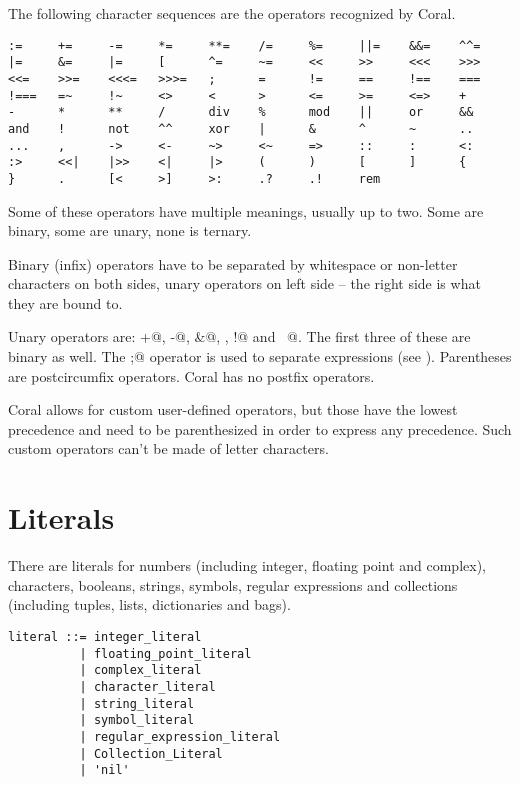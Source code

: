 The following character sequences are the operators recognized by Coral. 

\begin{lstlisting}
:=     +=     -=     *=     **=    /=     %=     ||=    &&=    ^^= 
|=     &=     |=     [      ^=     ~=     <<     >>     <<<    >>> 
<<=    >>=    <<<=   >>>=   ;      =      !=     ==     !==    === 
!===   =~     !~     <>     <      >      <=     >=     <=>    + 
-      *      **     /      div    %      mod    ||     or     && 
and    !      not    ^^     xor    |      &      ^      ~      .. 
...    ,      ->     <-     ~>     <~     =>     ::     :      <: 
:>     <<|    |>>    <|     |>     (      )      [      ]      { 
}      .      [<     >]     >:     .?     .!     rem
\end{lstlisting}

Some of these operators have multiple meanings, usually up to two. Some are binary, some are unary, none is ternary. 

Binary (infix) operators have to be separated by whitespace or non-letter characters on both sides, unary operators on left side – the right side is what they are bound to. 

Unary operators are: \lstinline@+@, \lstinline@-@, \lstinline@&@, \lstinline@not@, \lstinline@!@ and \lstinline@~@. The first three of these are binary as well. The \lstinline@;@ operator is used to separate expressions (see ). Parentheses are postcircumfix operators. Coral has no postfix operators. 

Coral allows for custom user-defined operators, but those have the lowest precedence and need to be parenthesized in order to express any precedence. Such custom operators can't be made of letter characters. 

\section{Literals}\label{sec:literals}

There are literals for numbers (including integer, floating point and complex), characters, booleans, strings, symbols, regular expressions and collections (including tuples, lists, dictionaries and bags). 

\syntax\begin{lstlisting}
literal ::= integer_literal
	      | floating_point_literal
	      | complex_literal
	      | character_literal
	      | string_literal
	      | symbol_literal
	      | regular_expression_literal
	      | Collection_Literal
	      | 'nil'
\end{lstlisting}

